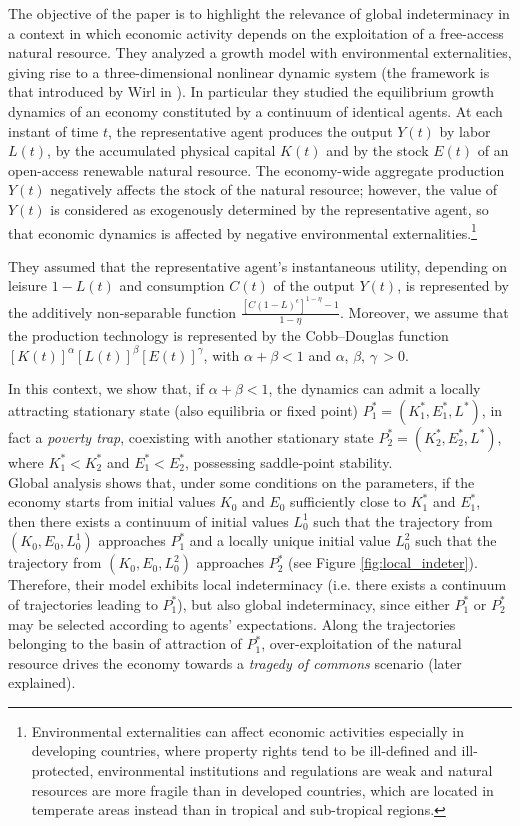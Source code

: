 The objective of the paper \cite{antoci_poverty_2011} is to highlight the relevance of global indeterminacy in a context in which economic activity depends on the exploitation of a free-access natural resource. They analyzed a growth model with environmental externalities, giving rise to a three-dimensional nonlinear dynamic system (the framework is that introduced by Wirl in \cite{wirl_stability_1997}). In particular they studied the equilibrium growth dynamics of an economy constituted by a continuum of identical agents. At each instant of time $t$, the representative agent produces the output $Y(t)$ by labor $L(t)$, by the accumulated physical capital $K(t)$ and by the stock $E(t)$ of an open-access renewable natural resource. The economy-wide aggregate production $Y(t)$ negatively affects the stock of the natural resource; however, the value of $Y(t)$ is considered as exogenously determined by the representative agent, so that economic dynamics is affected by negative environmental externalities.\footnote{Environmental externalities can affect economic activities especially in developing countries, where property rights tend to be ill-defined and ill-protected, environmental institutions and regulations are weak and natural resources are more fragile than in developed countries, which are located in temperate areas instead than in tropical and sub-tropical regions.}

They assumed that the representative agent’s instantaneous utility, depending on leisure $1-L(t)$ and consumption $C(t)$ of the output $Y(t)$, is represented by the additively non-separable function $\frac{[C(1-L)^{\epsilon}]^{1-\eta} -1}{1-\eta}$. Moreover, we assume that the production technology is represented by the Cobb–Douglas function $[K(t)]^\alpha [L(t)]^\beta [E(t)]^\gamma$, with $\alpha + \beta < 1$ and $\alpha$, $\beta$, $\gamma \,>0$. 

In this context, we show that, if $\alpha + \beta < 1$, the dynamics can admit a locally attracting stationary state (also equilibria or fixed point) $P_1^* = (K_1^*, E_1^*, L^*)$, in fact a \textit{poverty trap}, coexisting with another stationary state $P_2^* = (K_2^*,E_2^*,L^*)$, where $K_1^* < K_2^*$ and $E_1^* < E_2^*$, possessing saddle-point stability.\\ 
Global analysis shows that, under some conditions on the parameters, if the economy starts
from initial values $K_0$ and $E_0$ sufficiently close to $K_1^*$ and $E_1^*$, then there exists a continuum of initial values $L_0^1$ such that the trajectory from $(K_0,E_0,L_0^1)$ approaches $P_1^*$ and a locally unique initial value $L_0^2$ such that the trajectory from $(K_0,E_0,L_0^2)$ approaches $P_2^*$ (see Figure \ref{fig:local_indeter}). Therefore, their model exhibits local indeterminacy (i.e. there exists a continuum of trajectories leading to $P_1^*$), but also global indeterminacy, since either $P_1^*$ or $P_2^*$ may be selected according to agents’ expectations. Along the trajectories belonging to the basin of attraction of $P_1^*$, over-exploitation
of the natural resource drives the economy towards a \textit{tragedy of commons} scenario (later explained).


